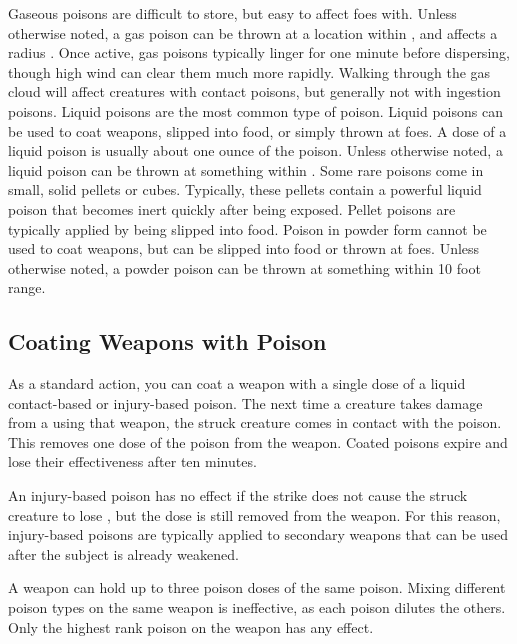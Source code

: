      Gaseous poisons are difficult to store, but easy to affect foes with.
    Unless otherwise noted, a gas poison can be thrown at a location within \shortrange, and affects a \tinyarea radius .
    Once active, gas poisons typically linger for one minute before dispersing, though high wind can clear them much more rapidly.
    Walking through the gas cloud will affect creatures with contact poisons, but generally not with ingestion poisons.
     Liquid poisons are the most common type of poison.
    Liquid poisons can be used to coat weapons, slipped into food, or simply thrown at foes.
    A dose of a liquid poison is usually about one ounce of the poison.
    Unless otherwise noted, a liquid poison can be thrown at something within \shortrange.
     Some rare poisons come in small, solid pellets or cubes.
    Typically, these pellets contain a powerful liquid poison that becomes inert quickly after being exposed.
    Pellet poisons are typically applied by being slipped into food.
     Poison in powder form cannot be used to coat weapons, but can be slipped into food or thrown at foes.
    Unless otherwise noted, a powder poison can be thrown at something within 10 foot range.

  \subsection{Coating Weapons with Poison}\label{Coating Weapons with Poison}
    As a standard action, you can coat a weapon with a single dose of a liquid contact-based or injury-based poison.
    The next time a creature takes damage from a  using that weapon, the struck creature comes in contact with the poison.
    This removes one dose of the poison from the weapon.
    Coated poisons expire and lose their effectiveness after ten minutes.

    An injury-based poison has no effect if the strike does not cause the struck creature to lose , but the dose is still removed from the weapon.
    For this reason, injury-based poisons are typically applied to secondary weapons that can be used after the subject is already weakened.

    A weapon can hold up to three poison doses of the same poison.
    Mixing different poison types on the same weapon is ineffective, as each poison dilutes the others.
    Only the highest rank poison on the weapon has any effect.

